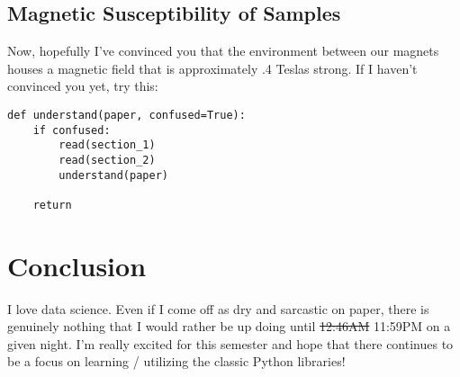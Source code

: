 \documentclass{article}
\begin{document}
\subsection{Magnetic Susceptibility of Samples}
Now, hopefully I've convinced you that the environment between our magnets
houses a magnetic field that is approximately .4 Teslas strong. If I haven't
convinced you yet, try this:

\begin{center}
\begin{minipage}[t]{.75\textwidth}
\begin{lstlisting}[frame=tlrb]
def understand(paper, confused=True):
    if confused:
        read(section_1)
        read(section_2)
        understand(paper)

    return 
\end{lstlisting}
\end{minipage}
\end{center}

\section{Conclusion}
I love data science. Even if I come off as dry and sarcastic on paper,
there is genuinely nothing that I would rather be up doing until \st{12:46AM}
11:59PM on a given night. I'm really excited for this semester and hope that
there continues to be a focus on learning / utilizing the classic Python
libraries!
\end{document}
